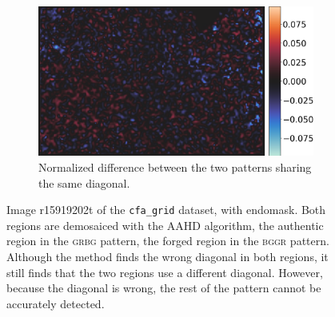 \documentclass{ipol}
\begin{document}
\begin{figure}[ht]
\begin{subfigure}[t]{.365\linewidth}
                \includegraphics[width=\linewidth]{images/aahd_nodual/out_diff_grid.png}
                \caption{Normalized difference between the two patterns sharing the same diagonal.}
        \end{subfigure}
        \caption{Image r15919202t of the \texttt{cfa\_grid} dataset, with endomask. Both regions are demosaiced with the AAHD algorithm, the authentic region in the \textsc{grbg} pattern, the forged region in the \textsc{bggr} pattern. Although the method finds the wrong diagonal in both regions, it still finds that the two regions use a different diagonal. However, because the diagonal is wrong, the rest of the pattern cannot be accurately detected.}
\end{figure}
\end{document}
